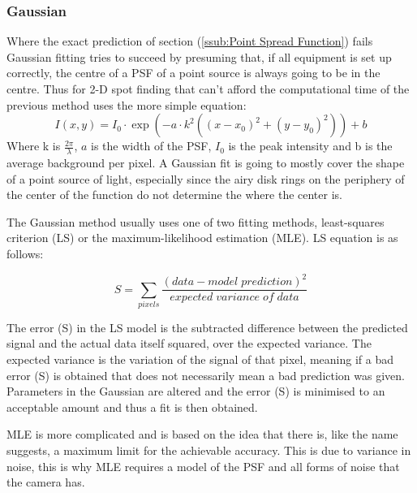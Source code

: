 \documentclass[aps,pra,a4paper,nofootinbib,onecolumn,tightenlines,longbibliography,12pt,amsfonts,amssymb,amsmath,floatfix]{revtex4-2} %
\begin{document}
    \subsubsection{Gaussian} %
    \label{ssub:Gaussian}

    Where the exact prediction of section (\ref{ssub:Point Spread Function}) fails Gaussian fitting tries to succeed 
    by presuming that, if all equipment is set up correctly, the centre of a PSF of a point source is 
    always going to be in the centre. Thus for 2-D spot finding that can't afford the computational time of 
    the previous method uses the more simple equation:
    \begin{equation}\label{Gaussian}
    I(x,y)=I_0\cdot \exp(-a\cdot k^2((x-x_0)^2+(y-y_0)^2))+b
    \end{equation}
    Where k is $\frac{2\pi}{\lambda}$, $a$ is the width of the PSF, $I_0$ is the peak intensity and b is the average background per pixel. \cite{small2014fluorophore}
    A Gaussian fit is going to mostly cover the shape of a point source of light, especially since the airy disk rings on 
    the periphery of the center of the function do not determine the where the center is. 
    
    The Gaussian method usually uses one of two fitting methods, least-squares criterion (LS) or the 
    maximum-likelihood estimation (MLE). \cite{small2014fluorophore} LS equation is as follows: 

    \begin{equation}\label{LS}
      S=\sum_{pixels}\frac{(data-model\;prediction)^2}{expected\;variance\;of\;data}
    \end{equation}

    The error (S) in the LS model is the subtracted difference between the predicted signal and the actual 
    data itself squared, over the expected variance. The expected variance is the variation of the signal 
    of that pixel, meaning if a bad error (S) is obtained that does not necessarily mean a bad prediction was 
    given. Parameters in the Gaussian are altered and the error (S) is minimised to an acceptable amount and thus 
    a fit is then obtained.

    MLE is more complicated and is based on the idea that there is, like the name suggests, a maximum limit for the
    achievable accuracy. This is due to variance in noise, this is why MLE requires a model of the PSF and all 
    forms of noise that the camera has. 
\end{document}
